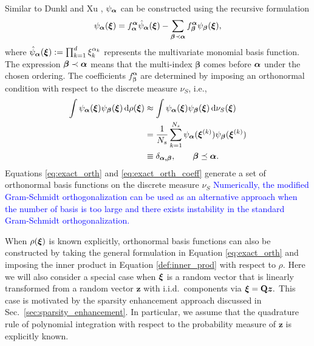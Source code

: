 Similar to Dunkl and Xu \cite{dunkl_xu_2014}, $\psi_{\bm\alpha}$ can be constructed using the recursive formulation 
\begin{equation}
  \psi_{\bm{\alpha}}(\bm\xi) = f_{\bm{\alpha}}^{\bm{\alpha}} \hat{\psi}_{\bm\alpha}(\bm\xi) - \sum_{\bm{\beta} \prec \bm{\alpha}} f_{\bm{\beta}}^{\bm{\alpha}} \psi_{\bm{\beta}}(\bm\xi),
  \label{eq:exact_orth}
\end{equation}
where $\hat{\psi}_{\bm\alpha}(\bm\xi) := \prod_{k=1}^{d} \xi^{\alpha_k}_k$ represents the multivariate monomial basis function.
The expression $\bm{\beta} \prec \bm\alpha$ means that the multi-index $\bm{\beta}$ comes before $\bm\alpha$ under the chosen ordering.   
The coefficients $f_{\bm{\beta}}^{\bm{\alpha}}$ are determined by imposing an orthonormal condition with respect to the discrete measure $\nu_{S}$, i.e.,
\begin{equation}
  \begin{split}
    \int \psi_{\bm{\alpha}}(\bm{\xi}) \psi_{\bm{\beta}}(\bm{\xi}) \,\mathrm{d} \rho(\bm\xi)  &\approx \int \psi_{\bm{\alpha}}(\bm{\xi}) \psi_{\bm{\beta}}(\bm{\xi}) \,\mathrm{d} \nu_{S}(\bm\xi) \\
    &= \frac{1}{N_s}\sum_{k=1}^{N_s} \psi_{\bm{\alpha}}(\bm{\xi}^{(k)})\psi_{\bm{\beta}}(\bm{\xi}^{(k)}) \\
    &  \equiv \delta_{\bm{\alpha,\beta}}, \quad\quad \bm{\beta} \preceq \bm{\alpha}.
  \end{split} \label{eq:exact_orth_coeff}
\end{equation} 
Equations \eqref{eq:exact_orth} and \eqref{eq:exact_orth_coeff} generate a set of orthonormal basis 
functions on the discrete measure 
$\nu_{S}$ 
%
\textcolor{blue}{Numerically, the modified Gram-Schmidt orthogonalization can be 
used as an alternative approach when the number of basis is too large and there exists 
instability in the standard Gram-Schmidt orthogonalization.}

When $\rho(\bm\xi)$ is known explicitly, orthonormal basis functions can also be constructed 
by taking the general formulation in Equation \eqref{eq:exact_orth} and 
imposing the inner product in Equation \eqref{def:inner_prod} with respect to $\rho$.
Here we will also consider a special case when $\bm\xi$ is a random vector that is 
linearly transformed from {\color{blue} a random vector $\bm z$ with i.i.d.\ components} via $\bm\xi = \mathbf{Q}\bm z.$ 
This case is motivated by the sparsity enhancement approach discussed in 
Sec.\ \ref{sec:sparsity_enhancement}. In particular, we assume that the quadrature rule 
of polynomial integration
with respect to the probability measure of $\bm z$ is explicitly known. 


